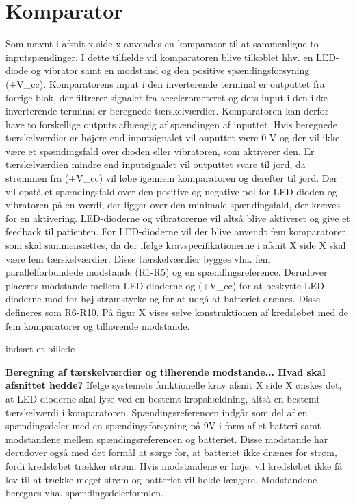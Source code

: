 \section{Komparator}
Som nævnt i afsnit x side x anvendes en komparator til at sammenligne to inputspændinger. %
I dette tilfælde vil komparatoren blive tilkoblet hhv. en LED-diode og vibrator samt en modstand og den positive spændingsforsyning (+V_{cc}). Komparatorens input i den inverterende terminal er outputtet fra forrige blok, der filtrerer signalet fra accelerometeret og dets input i den ikke-inverterende terminal er beregnede tærskelværdier. Komparatoren kan derfor have to forskellige outputs afhængig af spændingen af inputtet. Hvis beregnede tærskelværdier er højere end inputsignalet vil ouputtet være 0 V og der vil ikke være et spændingsfald over dioden eller vibratoren, som aktiverer den. Er tærskelværdien mindre end inputsignalet vil outputtet svare til jord, da strømmen fra (+V_{cc}) vil løbe igennem komparatoren og derefter til jord. Der vil opstå et spændingsfald over den positive og negative pol for LED-dioden og vibratoren på en værdi, der ligger over den minimale spændingsfald, der kræves for en aktivering. LED-dioderne og vibratorerne vil altså blive aktiveret og give et feedback til patienten. 
For LED-dioderne vil der blive anvendt fem komparatorer, som skal sammensættes, da der ifølge kravspecifikationerne i afsnit X side X skal være fem tærskelværdier. Disse tærskelværdier bygges vha. fem parallelforbundede modstande (R1-R5) og en spændingsreference. Derudover placeres modstande mellem LED-dioderne og (+V_{cc}) for at beskytte LED-dioderne mod for høj strømstyrke og for at udgå at batteriet drænes. Disse defineres som R6-R10. På figur X vises selve konstruktionen af kredsløbet med de fem komparatorer og tilhørende modstande.

indsæt et billede

\textbf{Beregning af tærskelværdier og tilhørende modstande... Hvad skal afsnittet hedde?}
Ifølge systemets funktionelle krav afsnit X side X ønskes det, at LED-dioderne skal lyse ved en bestemt kropshældning, altså en bestemt tærskelværdi i komparatoren. Spændingsreferencen indgår som del af en spændingsdeler med en spændingsforsyning på 9V i form af et batteri samt modstandene mellem spændingsreferencen og batteriet. Disse modstande har derudover også med det formål at sørge for, at batteriet ikke drænes for strøm, fordi kredsløbet trækker strøm. Hvis modstandene er høje, vil kredsløbet ikke få lov til at trække meget strøm og batteriet vil holde længere. Modstandene beregnes vha. spændingsdelerformlen. 

